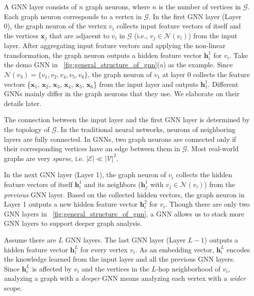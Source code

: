 A GNN layer consists of $n$ graph neurons, where $n$ is the number of vertices in $\mathcal{G}$.
Each graph neuron corresponds to a vertex in $\mathcal{G}$.
In the first GNN layer (Layer 0), the graph neuron of the vertex $v_i$ collects input feature vectors of itself and the vertices $\boldsymbol{x}_j$ that are adjacent to $v_i$ in $\mathcal{G}$ (i.e., $v_j \in \mathcal{N}(v_i)$) from the input layer.
After aggregating input feature vectors and applying the non-linear transformation, the graph neuron outputs a hidden feature vector $\boldsymbol{h}^1_i$ for $v_i$.
Take the demo GNN in \figurename~\ref{fig:general_structure_of_gnn}(a) as the example.
Since $\mathcal{N}(v_3) = \{v_1, v_2, v_4, v_5, v_6\}$, the graph neuron of $v_1$ at layer 0 collects the feature vectors \{$\boldsymbol{x}_1$, $\boldsymbol{x}_2$, $\boldsymbol{x}_3$, $\boldsymbol{x}_4$, $\boldsymbol{x}_5$, $\boldsymbol{x}_6$\} from the input layer and outputs $\boldsymbol{h}^1_1$.
Different GNNs mainly differ in the graph neurons that they use.
We elaborate on their details later.

The connection between the input layer and the first GNN layer is determined by the topology of $\mathcal{G}$.
In the traditional neural networks, neurons of neighboring layers are fully connected.
In GNNs, two graph neurons are connected only if their corresponding vertices have an edge between them in $\mathcal{G}$.
Most real-world graphs are very \emph{sparse}, i.e. $|\mathcal{E}| \ll |\mathcal{V}|^2$.


In the next GNN layer (Layer 1), the graph neuron of $v_i$ collects the hidden feature vectors of itself $\boldsymbol{h}^1_i$ and its neighbors ($\boldsymbol{h}^1_j$ with $v_j \in \mathcal{N}(v_i)$) from the \emph{previous} GNN layer.
Based on the collected hidden vectors, the graph neuron in Layer 1 outputs a new hidden feature vector $\boldsymbol{h}^2_i$ for $v_i$.
Though there are only two GNN layers in \figurename~\ref{fig:general_structure_of_gnn}, a GNN allows us to stack more GNN layers to support deeper graph analysis.

Assume there are $L$ GNN layers.
The last GNN layer (Layer $L-1$) outputs a hidden feature vector $\boldsymbol{h}^{L}_i$ for every vertex $v_i$.
As an embedding vector, $\boldsymbol{h}^L_i$ encodes the knowledge learned from the input layer and all the previous GNN layers.
Since $\boldsymbol{h}^L_i$ is affected by $v_i$ and the vertices in the $L$-hop neighborhood of $v_i$, analyzing a graph with a \emph{deeper} GNN means analyzing each vertex with a \emph{wider} scope.

